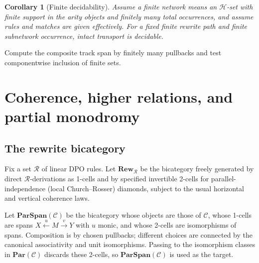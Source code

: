 \documentclass[12pt,a4paper,twoside]{extarticle}
\makeatletter
\theoremstyle{compactplain}
\newtheorem{corollary}[theorem]{Corollary}
\theoremstyle{compactdef}
\renewenvironment{proof}[1][\proofname]{\par\pushQED{\qed}\normalfont
  \topsep2pt\trivlist\item[\hskip\labelsep\bfseries #1\@addpunct{.}]\ignorespaces}
 {\popQED\endtrivlist\@endpefalse}
\makeatother
\begin{document}
\begin{corollary}[Finite decidability]
Assume a finite network means an $\mathcal H$-set with finite support in the arity objects and finitely many total occurrences, and assume rules and matches are given effectively. For a fixed finite rewrite path and finite subnetwork occurrence, intact transport is decidable.
\end{corollary}
\begin{proof}
Compute the composite track span by finitely many pullbacks and test componentwise inclusion of finite sets.
\end{proof}
\section{Coherence, higher relations, and partial monodromy}

\subsection{The rewrite bicategory}
Fix a set $\mathcal R$ of linear DPO rules. Let $\mathbf{Rew}_{\mathcal R}$ be the bicategory freely generated by direct $\mathcal R$-derivations as 1-cells and by specified invertible 2-cells for parallel-independence (local Church--Rosser) diamonds, subject to the usual horizontal and vertical coherence laws.

Let $\mathbf{ParSpan}(\mathcal C)$ be the bicategory whose objects are those of $\mathcal C$, whose 1-cells are spans $X\xleftarrow{u}M\xrightarrow{v}Y$ with $u$ monic, and whose 2-cells are isomorphisms of spans. Composition is by chosen pullbacks; different choices are connected by the canonical associativity and unit isomorphisms. Passing to the isomorphism classes in $\mathbf{Par}(\mathcal C)$ discards these 2-cells, so $\mathbf{ParSpan}(\mathcal C)$ is used as the target.
\end{document}
